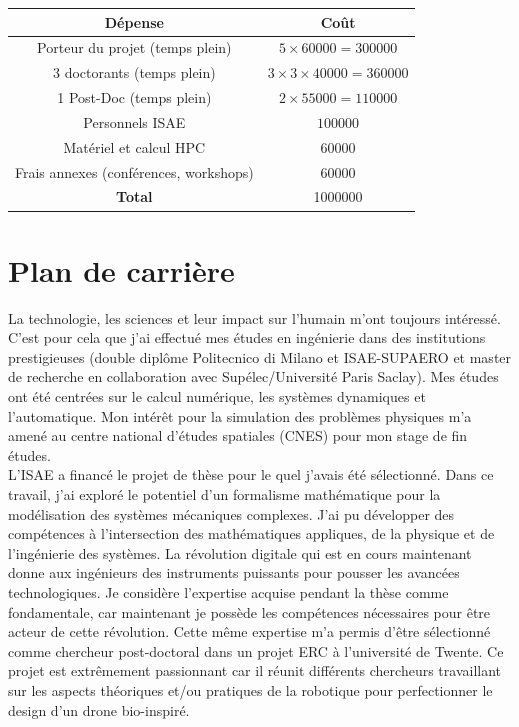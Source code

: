 \documentclass[12pt, french]{article}
\begin{document}
\begin{center}
\begin{tabular}{|c|c|}
	\hline
	D\'epense & Co\^{u}t \\
	\hline
	Porteur du projet (temps plein) & $5\times 60000=300000$ \\
	3 doctorants (temps plein) & $3\times 3\times 40000=360000$  \\
	1 Post-Doc (temps plein) & $2\times 55000=110000$ \\
	Personnels ISAE & $100000$ \\
	Matériel  et calcul HPC & $60000$ \\
	Frais annexes (conférences, workshops) & $60000$ \\
	\hline
	\textbf{Total} & 1000000 \\
	\hline
\end{tabular}
\end{center}






\section{Plan de carrière}

La technologie, les sciences et leur impact sur l'humain m'ont toujours intéressé. C'est pour cela que j'ai effectué mes études en ingénierie dans des institutions prestigieuses (double diplôme Politecnico di Milano et ISAE-SUPAERO et master de recherche en collaboration avec Supélec/Université Paris Saclay). Mes études ont été centrées sur le calcul numérique, les systèmes dynamiques et l'automatique. Mon intérêt pour la simulation des problèmes physiques m'a amené au centre national d'études spatiales (CNES) pour mon stage de fin études. \\

L'ISAE a financé le projet de thèse pour le quel j'avais été sélectionné. Dans ce travail, j'ai exploré le potentiel d'un formalisme mathématique pour la modélisation des systèmes mécaniques complexes. J'ai pu développer des compétences à l'intersection des mathématiques appliques, de la physique et de l'ingénierie des systèmes. La révolution digitale qui est en cours maintenant donne aux ingénieurs des instruments puissants pour pousser les avancées technologiques. Je considère l'expertise acquise pendant la thèse comme fondamentale, car maintenant je possède les compétences nécessaires pour être acteur de cette révolution. Cette même expertise m'a permis d'être sélectionné comme chercheur post-doctoral dans un projet ERC à l'université de Twente. Ce projet est extrêmement passionnant car il réunit différents chercheurs travaillant sur les aspects théoriques et/ou pratiques de la robotique pour perfectionner le design d'un drone bio-inspiré. \\
\end{document}

